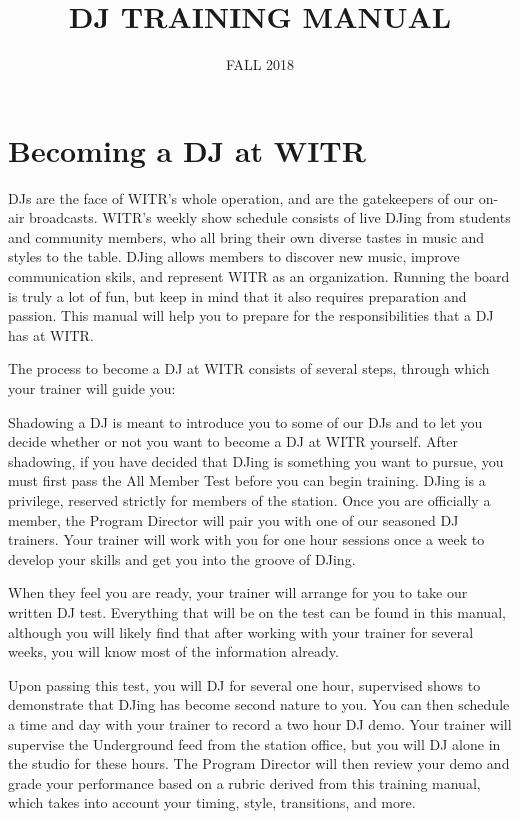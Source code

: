 \documentclass{witrman}
\title{DJ TRAINING MANUAL}
\date{FALL 2018}
\begin{document}
\maketitle

\maketoc

\setpagebg

\chapter{Becoming a DJ at WITR}

DJs are the face of WITR's whole operation, and are the gatekeepers of our
on-air broadcasts.  WITR's weekly show schedule consists of live DJing from
students and community members, who all bring their own diverse tastes in music
and styles to the table.  DJing allows members to discover new music, improve
communication skils, and represent WITR as an organization.  Running the board
is truly a lot of fun, but keep in mind that it also requires preparation and
passion.  This manual will help you to prepare for the responsibilities that a
DJ has at WITR.

The process to become a DJ at WITR consists of several steps, through which your
trainer will guide you:


Shadowing a DJ is meant to introduce you to some of our DJs and to let you
decide whether or not you want to become a DJ at WITR yourself.  After
shadowing, if you have decided that DJing is something you want to pursue, you
must first pass the All Member Test before you can begin training.  DJing is a
privilege, reserved strictly for members of the station.  Once you are
officially a member, the Program Director will pair you with one of our seasoned
DJ trainers.  Your trainer will work with you for one hour sessions once a week
to develop your skills and get you into the groove of DJing.

When they feel you are ready, your trainer will arrange for you to take our
written DJ test.  Everything that will be on the test can be found in this
manual, although you will likely find that after working with your trainer for
several weeks, you will know most of the information already.

Upon passing this test, you will DJ for several one hour, supervised shows to
demonstrate that DJing has become second nature to you.  You can then schedule a
time and day with your trainer to record a two hour DJ demo.  Your trainer will
supervise the Underground feed from the station office, but you will DJ alone in
the studio for these hours.  The Program Director will then review your demo and
grade your performance based on a rubric derived from this training manual,
which takes into account your timing, style, transitions, and more.
\end{document}
